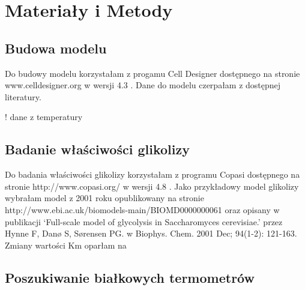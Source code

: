 \documentclass{pracamgr}
\begin{document}


% 

\chapter{Materiały i Metody}
\section{Budowa modelu}

Do budowy modelu korzystałam z progamu Cell Designer dostępnego na stronie www.celldesigner.org w wersji 4.3 . Dane do
modelu czerpałam z dostępnej literatury.

! dane z temperatury 

\section{Badanie właściwości glikolizy}

Do badania właściwości glikolizy korzystałam z programu Copasi dostępnego na stronie  http://www.copasi.org/ w wersji 4.8 .
Jako przykładowy model glikolizy wybrałam model z 2001 roku opublikowany na stronie http://www.ebi.ac.uk/biomodels-main/BIOMD0000000061
oraz opisany w publikacji `Full-scale model of glycolysis in Saccharomyces cerevisiae.' przez Hynne F, Danø S, Sørensen PG. w Biophys. Chem. 2001 Dec; 94(1-2): 121-163.
Zmiany wartości Km oparłam na %

\section{Poszukiwanie białkowych termometrów}
\end{document}
